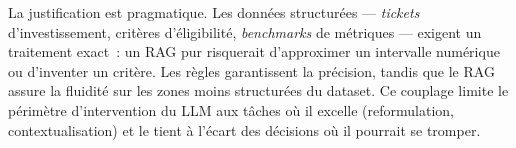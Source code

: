 La justification est pragmatique. Les données structurées --- \textit{tickets} d'investissement, critères d'éligibilité, \textit{benchmarks} de métriques --- exigent un traitement exact~: un \ac{RAG} pur risquerait d'approximer un intervalle numérique ou d'inventer un critère. Les règles garantissent la précision, tandis que le \ac{RAG} assure la fluidité sur les zones moins structurées du dataset. Ce couplage limite le périmètre d'intervention du \ac{LLM} aux tâches où il excelle (reformulation, contextualisation) et le tient à l'écart des décisions où il pourrait se tromper.
